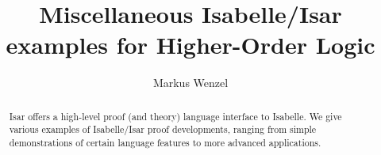 





\title{Miscellaneous Isabelle/Isar examples for Higher-Order Logic}
\author{Markus Wenzel}
\maketitle

\begin{abstract}
  Isar offers a high-level proof (and theory) language interface to Isabelle.
  We give various examples of Isabelle/Isar proof developments, ranging from
  simple demonstrations of certain language features to more advanced
  applications.
\end{abstract}

\tableofcontents



